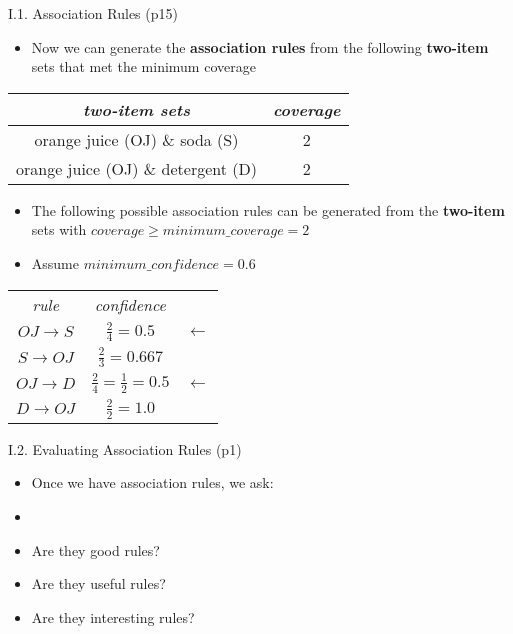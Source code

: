 \documentclass[handout]{beamer}
\newcommand{\strong}[1]{\textbf{\color{teal} #1}}
\begin{document}
\begin{frame}{I.1. Association Rules (p15)}
\begin{itemize}
\item Now we can generate the \strong{association rules} from the following \strong{two-item} sets that met the minimum coverage
\end{itemize}
\begin{center}
\begin{tabular}{|c|c|}
\emph{two-item sets} & \emph{coverage} \\
\hline
orange juice (OJ) \& soda (S) & 2 \\
\hline
orange juice (OJ) \& detergent (D) & 2 \\
\hline
\end{tabular}
\end{center}
\begin{itemize}
\item The following possible association rules can be generated from the \strong{two-item} sets with $coverage \ge minimum\_coverage = 2$
\item Assume $minimum\_confidence=0.6$
\end{itemize}
\begin{center}
\begin{tabular}{|c|c|l}
\emph{rule} & \emph{confidence} \\
\cline{1-2}
$OJ \rightarrow S$ & $\frac{2}{4} = 0.5$ & $\leftarrow$ \\
\cline{1-2}
$S \rightarrow OJ$ & $\frac{2}{3} = 0.667$ \\
\cline{1-2}
$OJ \rightarrow D$ & $\frac{2}{4} = \frac{1}{2} = 0.5$ & $\leftarrow$ \\
\cline{1-2}
$D \rightarrow OJ$ & $\frac{2}{2} = 1.0$ \\
\cline{1-2}
\end{tabular}
\end{center}
\end{frame}
\begin{frame}{I.2. Evaluating Association Rules (p1)}
\begin{itemize}
\item[] Once we have association rules, we ask:
\item[]
\item Are they good rules?
\item Are they useful rules?
\item Are they interesting rules?
\end{itemize}
\end{frame}
\end{document}
